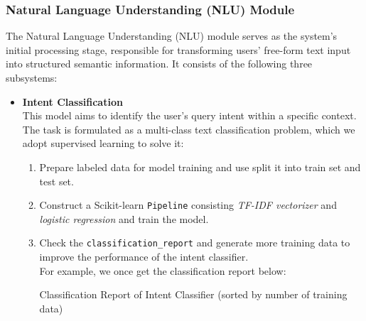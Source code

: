 \documentclass{xum_review}
\begin{document}
	\subsubsection{Natural Language Understanding (NLU) Module}\label{sec:nlu}

	The Natural Language Understanding (NLU) module serves as the system's
	initial processing stage, responsible for transforming users' free-form text
	input into structured semantic information\citep{article}. It consists of
	the following three subsystems:

	\begin{itemize}
		\item{\textbf{Intent Classification}}\\
		This model aims to identify the user's query intent within a specific
		context. The task is formulated as a multi-class text classification
		problem, which we adopt supervised learning to solve it:
		\begin{enumerate}
			\item Prepare labeled data for model training and use split it into
			train set and test set.

			\item Construct a Scikit-learn \texttt{Pipeline} consisting \textit{TF-IDF
			vectorizer} and \textit{logistic regression} and train the model\citep{batra-2023}.
			
			\item Check the \texttt{classification\_report} and generate more training data to improve the performance 
			of the intent classifier.\\
			For example, we once get the classification report below:
	\begin{table}[H] 
		\centering
		\caption{Classification Report of Intent Classifier (sorted by number of training data)}
		\label{tab:classification_report} 
		

\end{table}
\end{enumerate}
\end{itemize}
\end{document}

